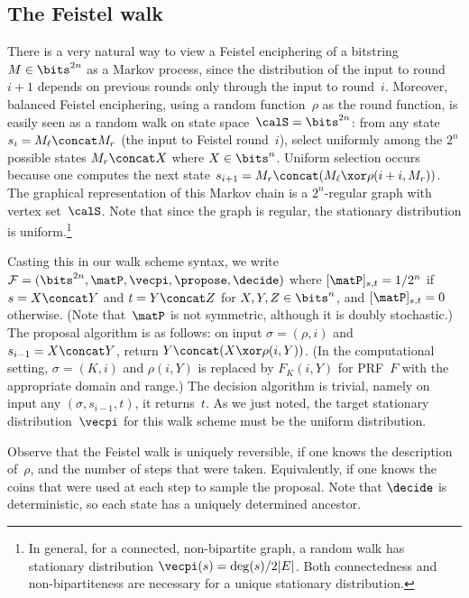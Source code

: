 \subsection{The Feistel walk} 
There is a very natural way to
view a Feistel enciphering of a bitstring $M \in \bits^{2n}$ as a
Markov process, since the distribution of the input to round~$i+1$
depends on previous rounds only through the input to round~$i$.
Moreover, balanced Feistel enciphering, using a random function~$\rho$ as the round
function, is easily seen as a random walk on state
space~$\calS=\bits^{2n}$: from any state~$s_i = M_\ell \concat M_r$ 
(the input to Feistel round~$i$), select uniformly among the $2^n$
possible states $M_r \concat X$ where $X\in\bits^n$.  Uniform
selection occurs because one computes the next state $s_{i+1} = M_r
\concat (M_\ell \xor \rho(i+i,M_r))$.  The graphical representation of
this Markov chain is a $2^n$-regular graph with vertex set~$\calS$.
Note that since the graph is regular, the stationary distribution is
uniform.\footnote{In general, for a connected, non-bipartite graph, a
  random walk has stationary distribution
  $\vecpi(s)=\mathrm{deg}(s)/2|E|$.  Both connectedness and
  non-bipartiteness are necessary for a unique stationary
  distribution.}



Casting this in our walk scheme syntax, we write
$\mathcal{F}=(\bits^{2n},\matP,\vecpi,\propose,\decide)$ where
$[\matP]_{s,t}=1/2^n$ if $s = X \concat Y$ and $t=Y \concat Z$ for
$X,Y,Z \in \bits^n$, and $[\matP]_{s,t}=0$ otherwise. (Note
that~$\matP$ is not symmetric, although it is doubly stochastic.)  The proposal
algorithm is as follows: on input $\sigma=(\rho,i)$ and $s_{i-1}= X
\concat Y$, return $Y \concat (X \xor \rho(i,Y))$.  (In the
computational setting, $\sigma=(K,i)$ and $\rho(i,Y)$ is replaced by
$F_K(i,Y)$ for PRF~$F$ with the appropriate domain and range.) The decision
algorithm is trivial, namely on input any $(\sigma,s_{i-1},t)$, it returns~$t$.
As we just noted, the target stationary distribution~$\vecpi$ for this
walk scheme must be the uniform distribution.

Observe that the Feistel walk is uniquely reversible, if one knows the
description of~$\rho$, and the number of steps that were taken.
Equivalently, if one knows the coins that were used at each step to
sample the proposal.  Note that $\decide$ is deterministic, so each
state has a uniquely determined ancestor.

